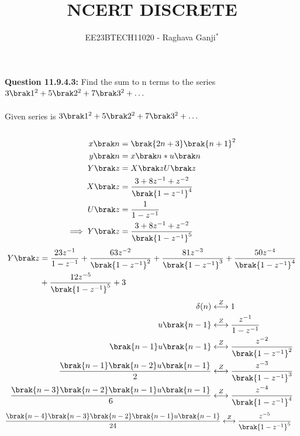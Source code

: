 \documentclass[journal,12pt,twocolumn]{IEEEtran}
\theoremstyle{remark}
\begin{document}

\vspace{3cm}

\title{NCERT DISCRETE}
\author{EE23BTECH11020 - Raghava Ganji$^{*}$%
}
\maketitle
\newpage
\bigskip

\renewcommand{\thefigure}{\theenumi}
\renewcommand{\thetable}{\theenumi}
\textbf{Question 11.9.4.3:}
Find the sum to n terms to the series $3\brak 1^2+5\brak 2^2+7\brak 3^2+ \ldots$\\ 
\solution\\
\fi
Given series is $3\brak 1^2+5\brak 2^2+7\brak 3^2+ \ldots$\\\\

\begin{align}
x\brak n&=\brak{2n+3}\brak{n+1}^2\\
y\brak n&=x\brak n*u\brak n\\
Y\brak z&=X\brak zU\brak z\\
X\brak z&=\frac{3+8z^{-1}+z^{-2}}{\brak{1-z^{-1}}^4}\\
U\brak z&=\frac{1}{1-z^{-1}}\\
\implies Y\brak z&=\frac{3+8z^{-1}+z^{-2}}{\brak{1-z^{-1}}^5}
\end{align}
\begin{align}
\notag Y\brak z&=\frac{23z^{-1}}{1-z^{-1}}+\frac{63z^{-2}}{\brak{1-z^{-1}}^2}+\frac{81z^{-3}}{\brak{1-z^{-1}}^3}+\frac{50z^{-4}}{\brak{1-z^{-1}}^4}\\&+\frac{12z^{-5}}{\brak{1-z^{-1}}^5}+3
\end{align}
\begin{align}
\delta (n) &\overset{Z}\longleftrightarrow 1\\
u \brak {n-1}&\overset{Z}\longleftrightarrow\frac{z^{-1}}{1-z^{-1}}\\
\brak{n-1}u\brak{n-1}&\overset{Z}\longleftrightarrow\frac{z^{-2}}{\brak{1-z^{-1}}^2}\\
\frac{\brak{n-1}\brak{n-2}u\brak{n-1}}{2}&\overset{Z}\longleftrightarrow\frac{z^{-3}}{\brak{1-z^{-1}}^3}\\
\frac{\brak{n-3}\brak{n-2}\brak{n-1}u\brak{n-1}}{6}&\overset{Z}\longleftrightarrow\frac{z^{-4}}{\brak{1-z^{-1}}^4}
\end{align}
\begin{align}
\frac{\brak{n-4}\brak{n-3}\brak{n-2}\brak{n-1}u\brak{n-1}}{24}&\overset{Z}\longleftrightarrow\frac{z^{-5}}{\brak{1-z^{-1}}^5}
\end{align}
\end{document}
